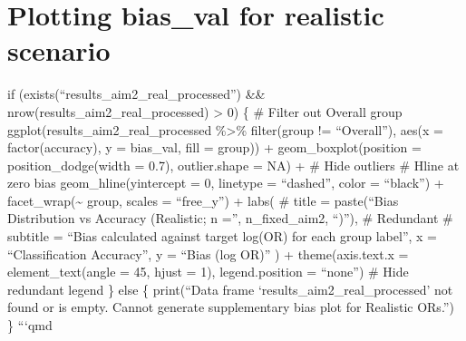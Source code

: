 \documentclass[
  letterpaper,
  DIV=11,
  numbers=noendperiod]{scrartcl}
\begin{document}
\section{Plotting bias\_val for realistic
scenario}\label{plotting-bias_val-for-realistic-scenario}

if (exists(``results\_aim2\_real\_processed'') \&\&
nrow(results\_aim2\_real\_processed) \textgreater{} 0) \{ \# Filter out
Overall group ggplot(results\_aim2\_real\_processed \%\textgreater\%
filter(group != ``Overall''), aes(x = factor(accuracy), y = bias\_val,
fill = group)) + geom\_boxplot(position = position\_dodge(width = 0.7),
outlier.shape = NA) + \# Hide outliers \# Hline at zero bias
geom\_hline(yintercept = 0, linetype = ``dashed'', color = ``black'') +
facet\_wrap(\textasciitilde{} group, scales = ``free\_y'') + labs( \#
title = paste(``Bias Distribution vs Accuracy (Realistic; n ='',
n\_fixed\_aim2, ``)''), \# Redundant \# subtitle = ``Bias calculated
against target log(OR) for each group label'', x = ``Classification
Accuracy'', y = ``Bias (log OR)'' ) + theme(axis.text.x =
element\_text(angle = 45, hjust = 1), legend.position = ``none'') \#
Hide redundant legend \} else \{ print(``Data frame
`results\_aim2\_real\_processed' not found or is empty. Cannot generate
supplementary bias plot for Realistic ORs.'') \} ```qmd
\end{document}
